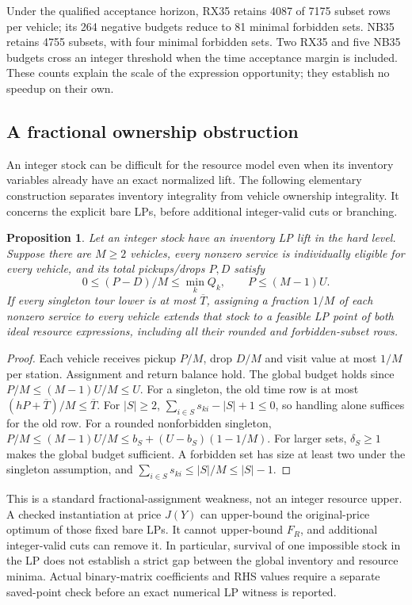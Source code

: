 \documentclass[11pt]{article}
\newtheorem{proposition}{Proposition}
\begin{document}
Under the qualified acceptance horizon, RX35 retains 4087 of 7175 subset
rows per vehicle; its 264 negative budgets reduce to 81 minimal forbidden
sets. NB35 retains 4755 subsets, with four minimal forbidden sets. Two
RX35 and five NB35 budgets cross an integer threshold when the time
acceptance margin is included. These counts explain the scale of the
expression opportunity; they establish no speedup on their own.

\subsection{A fractional ownership obstruction}
An integer stock can be difficult for the resource model even when its
inventory variables already have an exact normalized lift. The following
elementary construction separates inventory integrality from vehicle
ownership integrality. It concerns the explicit bare LPs, before additional
integer-valid cuts or branching.

\begin{proposition}
Let an integer stock have an inventory LP lift in the hard level. Suppose
there are $M\ge2$ vehicles, every nonzero service is individually eligible
for every vehicle, and its total pickups/drops $P,D$ satisfy
\[
 0\le(P-D)/M\le\min_k Q_k,\qquad P\le(M-1)U.
\]
If every singleton tour lower is at most $\overline T$, assigning a fraction
$1/M$ of each nonzero service to every vehicle extends that stock to a
feasible LP point of both ideal resource expressions, including all their
rounded and forbidden-subset rows.
\end{proposition}
\begin{proof}
Each vehicle receives pickup $P/M$, drop $D/M$ and visit value at most
$1/M$ per station. Assignment and return balance hold. The global budget
holds since $P/M\le(M-1)U/M\le U$. For a singleton, the old time row is at
most $(hP+\overline T)/M\le\overline T$. For $|S|\ge2$,
$\sum_{i\in S}s_{ki}-|S|+1\le0$, so handling alone suffices for the old
row. For a rounded nonforbidden singleton,
$P/M\le(M-1)U/M\le b_S+(U-b_S)(1-1/M)$.
For larger sets, $\delta_S\ge1$ makes the global budget sufficient.
A forbidden set has size at least two under the singleton assumption,
and $\sum_{i\in S}s_{ki}\le |S|/M\le |S|-1$.
\end{proof}

This is a standard fractional-assignment weakness, not an integer resource
upper. A checked instantiation at price $J(Y)$ can upper-bound the
original-price optimum of those fixed bare LPs. It cannot upper-bound
$F_R$, and additional integer-valid cuts can remove it. In particular,
survival of one impossible stock in the LP does not establish a strict
gap between the global inventory and resource minima. Actual binary-matrix
coefficients and RHS values require a separate saved-point check before
an exact numerical LP witness is reported.
\end{document}
